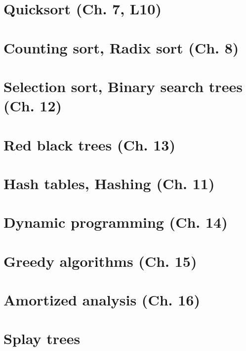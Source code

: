 \documentclass{article}
\begin{document}
\section{Quicksort (Ch. 7, L10)} %


\section{Counting sort, Radix sort (Ch. 8)}


\section{Selection sort, Binary search trees (Ch. 12)}


\section{Red black trees (Ch. 13)}


\section{Hash tables, Hashing (Ch. 11)}


\section{Dynamic programming (Ch. 14)}


\section{Greedy algorithms (Ch. 15)} %


\section{Amortized analysis (Ch. 16)}


\section{Splay trees}

\end{document}
